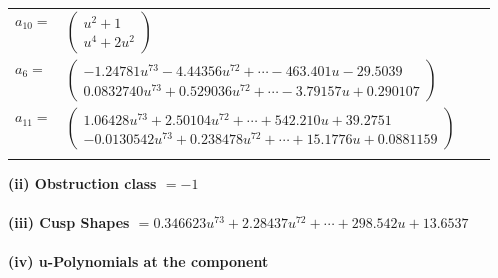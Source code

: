 \documentclass[1p]{elsarticle_modified}
\theoremstyle{definition}
\begin{document}
\begin{tabular}{m{7pt} m{180pt} m{7pt} m{180pt} }
\flushright $a_{10}=$&$\begin{pmatrix}u^2+1\\u^4+2 u^2\end{pmatrix}$ \\
\flushright $a_{6}=$&$\begin{pmatrix}-1.24781 u^{73}-4.44356 u^{72}+\cdots-463.401 u-29.5039\\0.0832740 u^{73}+0.529036 u^{72}+\cdots-3.79157 u+0.290107\end{pmatrix}$ \\
\flushright $a_{11}=$&$\begin{pmatrix}1.06428 u^{73}+2.50104 u^{72}+\cdots+542.210 u+39.2751\\-0.0130542 u^{73}+0.238478 u^{72}+\cdots+15.1776 u+0.0881159\end{pmatrix}$\\&\end{tabular}
\flushleft \textbf{(ii) Obstruction class $= -1$}\\~\\
\flushleft \textbf{(iii) Cusp Shapes $= 0.346623 u^{73}+2.28437 u^{72}+\cdots+298.542 u+13.6537$}\\~\\
\newpage\renewcommand{\arraystretch}{1}
\flushleft \textbf{(iv) u-Polynomials at the component}\newline \\
\end{document}
